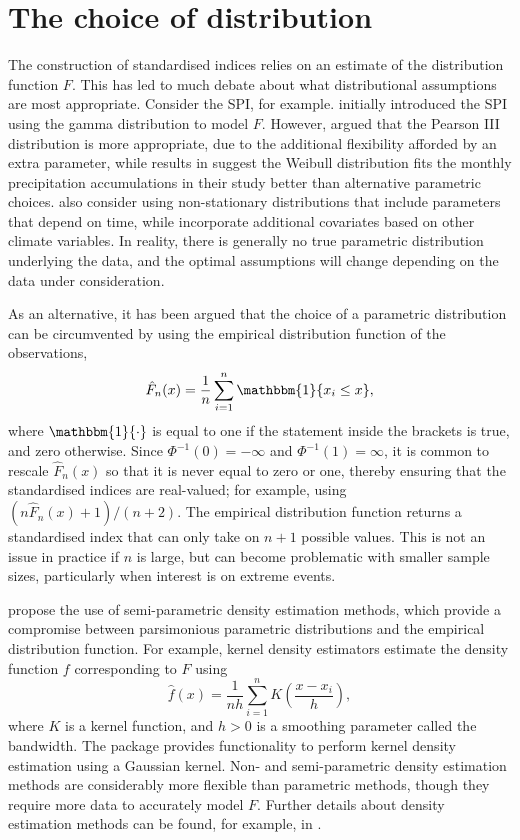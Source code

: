 \documentclass[article,shortnames,nojss]{jss}\usepackage[]{graphicx}\usepackage[]{xcolor}
\newcommand{\one}{\mathbbm{1}}
\begin{document}
\section{The choice of distribution}\label{section:distribution}

The construction of standardised indices relies on an estimate of the distribution function $F$. This has led to much debate about what distributional assumptions are most appropriate. Consider the SPI, for example.  \cite{McKeeEtAl1993} initially introduced the SPI using the gamma distribution to model $F$. However, \cite{Guttman1999} argued that the Pearson III distribution is more appropriate, due to the additional flexibility afforded by an extra parameter, while results in \cite{StaggeEtAl2015} suggest the Weibull distribution fits the monthly precipitation accumulations in their study better than alternative parametric choices. \cite{RussoEtAl2013} also consider using non-stationary distributions that include parameters that depend on time, while \cite{LiEtAl2015} incorporate additional covariates based on other climate variables. In reality, there is generally no true parametric distribution underlying the data, and the optimal assumptions will change depending on the data under consideration.

As an alternative, it has been argued \citep[e.g.][]{ErhardtCzado2018,HaoEtAl2019,AllenOtero2023} that the choice of a parametric distribution can be circumvented by using the empirical distribution function of the observations,
\begin{equation}\label{eq:ecdf}
\hat{F}_{n}(x) = \frac{1}{n} \sum_{i=1}^{n} \one \{ x_{i} \leq x \},
\end{equation}
where $\one\{ \cdot \}$ is equal to one if the statement inside the brackets is true, and zero otherwise. Since $\Phi^{-1}(0) = -\infty$ and $\Phi^{-1}(1) = \infty$, it is common to rescale $\hat{F}_{n}(x)$ so that it is never equal to zero or one, thereby ensuring that the standardised indices are real-valued; for example, using $(n \hat{F}_{n}(x) + 1)/(n + 2)$. The empirical distribution function returns a standardised index that can only take on $n + 1$ possible values. This is not an issue in practice if $n$ is large, but can become problematic with smaller sample sizes, particularly when interest is on extreme events.

\cite{AllenOtero2023} propose the use of semi-parametric density estimation methods, which provide a compromise between parsimonious parametric distributions and the empirical distribution function. For example, kernel density estimators estimate the density function $f$ corresponding to $F$ using
\[
\hat{f}(x) = \frac{1}{nh} \sum_{i=1}^{n} K \left( \frac{x - x_{i}}{h} \right),
\]
where $K$ is a kernel function, and $h > 0$ is a smoothing parameter called the bandwidth. The  package provides functionality to perform kernel density estimation using a Gaussian kernel. Non- and semi-parametric density estimation methods are considerably more flexible than parametric methods, though they require more data to accurately model $F$. Further details about density estimation methods can be found, for example, in \cite{Silverman2018}.
\end{document}
